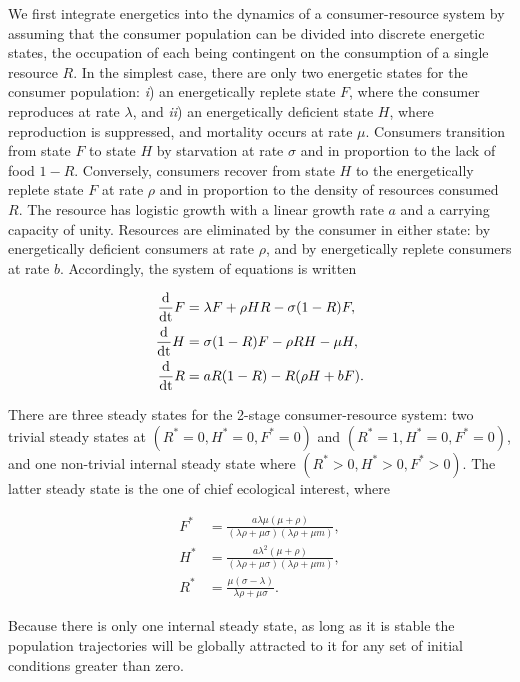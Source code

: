 \documentclass[11pt]{article}
\begin{document}
We first integrate energetics into the dynamics of a consumer-resource system by assuming that the consumer population can be divided into discrete energetic states, the occupation of each being contingent on the consumption of a single resource $R$.
In the simplest case, there are only two energetic states for the consumer population: \emph{i}) an energetically replete state $F$, where the consumer reproduces at rate $\lambda$, and \emph{ii}) an energetically deficient state $H$, where reproduction is suppressed, and mortality occurs at rate $\mu$.
Consumers transition from state $F$ to state $H$ by starvation at rate $\sigma$ and in proportion to the lack of food $1-R$.
Conversely, consumers recover from state $H$ to the energetically replete state $F$ at rate $\rho$ and in proportion to the density of resources consumed $R$.
The resource has logistic growth with a linear growth rate $a$ and a carrying capacity of unity.
Resources are eliminated by the consumer in either state: by energetically deficient consumers at rate $\rho$, and by energetically replete consumers at rate $b$.
Accordingly, the system of equations is written

\begin{align}
\frac{\rm d}{\rm dt} F &= \lambda F + \rho HR - \sigma (1-R)F, \nonumber \\
\frac{\rm d}{\rm dt} H &= \sigma (1-R)F - \rho RH - \mu H, \nonumber \\
\frac{\rm d}{\rm dt} R &= a R(1-R) - R(\rho H+ b F).
\end{align}

There are three steady states for the 2-stage consumer-resource system: two trivial steady states at $(R^*=0,H^*=0,F^*=0)$ and $(R^*=1,H^*=0,F^*=0)$, and one non-trivial internal steady state where $(R^*>0,H^*>0,F^*>0)$.
The latter steady state is the one of chief ecological interest, where

\begin{align}
F^* &= \frac{a  \lambda  \mu  (\mu +\rho )}{(\lambda  \rho +\mu  \sigma ) (\lambda  \rho +\mu  m)}, \nonumber \\
H^* &= \frac{a  \lambda ^2 (\mu +\rho )}{(\lambda  \rho +\mu  \sigma ) (\lambda  \rho +\mu  m)}, \nonumber \\
R^* &= \frac{\mu  (\sigma -\lambda )}{\lambda  \rho +\mu  \sigma }.	
\end{align}

\noindent Because there is only one internal steady state, as long as it is stable the population trajectories will be globally attracted to it for any set of initial conditions greater than zero.
\end{document}
